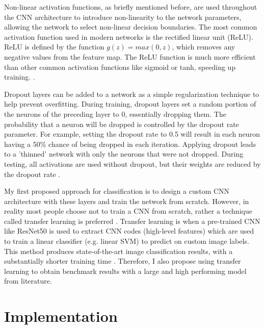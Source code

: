 \documentclass[10pt,twocolumn,letterpaper]{article}
\begin{document}
Non-linear activation functions, as briefly mentioned before, are used throughout the CNN architecture to introduce non-linearity to the network parameters, allowing the network to select non-linear decision boundaries. The most common activation function used in modern networks is the rectified linear unit (ReLU). ReLU is defined by the function $g(z) = max(0,z)$, which removes any negative values from the feature map. The ReLU function is much more efficient than other common activation functions like sigmoid or tanh, speeding up training. \cite{karpathy_2018_cnn}\cite{karpathy_2018_nn1}\cite[Ch.6]{nielsen2015neural}\cite[Ch.6, Ch.9]{goodfellow2016deep}\cite{andreopoulos2018CNN}. 

Dropout layers can be added to a network as a simple regularization technique to help prevent overfitting. During training, dropout layers set a random portion of the neurons of the preceding layer to 0, essentially dropping them. The probability that a neuron will be dropped is controlled by the dropout rate parameter. For example, setting the dropout rate to 0.5 will result in each neuron having a 50\% chance of being dropped in each iteration. Applying dropout leads to a 'thinned' network with only the neurons that were not dropped. During testing, all activations are used without dropout, but their weights are reduced by the dropout rate  \cite{srivastava2014dropout}\cite{karpathy_2018_nn2}\cite[p.258]{goodfellow2016deep}\cite{andreopoulos2018CNN}.

My first proposed approach for classification is to design a custom CNN architecture with these layers and train the network from scratch. However, in reality most people choose not to train a CNN from scratch, rather a technique called transfer learning is preferred \cite{karpathy_2018_transfer}. Transfer learning is when a pre-trained CNN like ResNet50 \cite{DBLP:journals/corr/HeZRS15} is used to extract CNN codes (high-level features) which are used to train a linear classifier (e.g. linear SVM) \cite{karpathy_2018_transfer} to predict on custom image labels. This method produces state-of-the-art image classification results, with a substantially shorter training time \cite{sharif2014cnn}. Therefore, I also propose using transfer learning to obtain benchmark results with a large and high performing model from literature.

\section{Implementation} \label{implementation}
\end{document}
